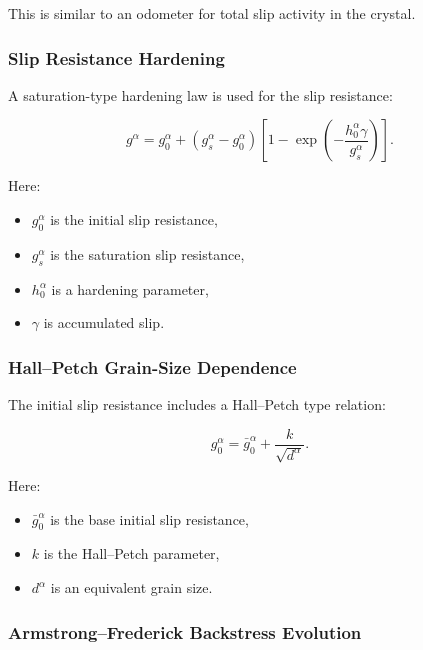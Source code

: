 \documentclass[11pt,a4paper]{article}
\begin{document}
This is similar to an odometer for total slip activity in the crystal.

\subsubsection{Slip Resistance Hardening}

A saturation-type hardening law is used for the slip resistance:

\begin{equation}
g^{\alpha}
=
 g_0^{\alpha}
+
(g_s^{\alpha}-g_0^{\alpha})
\left[
1-
\exp
\left(
-\frac{h_0^{\alpha}\gamma}
{g_s^{\alpha}}
\right)
\right].
\end{equation}

Here:

\begin{itemize}
    \item $g_0^{\alpha}$ is the initial slip resistance,
    \item $g_s^{\alpha}$ is the saturation slip resistance,
    \item $h_0^{\alpha}$ is a hardening parameter,
    \item $\gamma$ is accumulated slip.
\end{itemize}

\subsubsection{Hall--Petch Grain-Size Dependence}

The initial slip resistance includes a Hall--Petch type relation:

\begin{equation}
g_0^{\alpha}
=
\bar{g}_0^{\alpha}
+
\frac{k}{\sqrt{d^{\alpha}}}.
\end{equation}

Here:

\begin{itemize}
    \item $\bar{g}_0^{\alpha}$ is the base initial slip resistance,
    \item $k$ is the Hall--Petch parameter,
    \item $d^{\alpha}$ is an equivalent grain size.
\end{itemize}

\subsubsection{Armstrong--Frederick Backstress Evolution}
\end{document}

